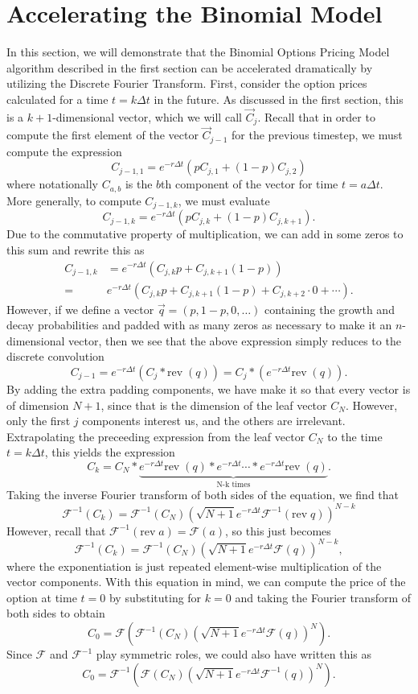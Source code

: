 \documentclass[11pt]{article}
\newcommand{\Rev}{\text{rev}\;}
\newcommand\del[1]{\left(#1\right)}
\newcommand\cF{\mathcal{F}}
\newcommand\Asterisk{*}
\begin{document}
\section*{Accelerating the Binomial Model}
In this section, we will demonstrate that the Binomial Options Pricing Model algorithm described in
the first section can be accelerated dramatically by utilizing the Discrete Fourier Transform.
First, consider the option prices calculated for a time $t = k\Delta t$ in the future. As discussed
in the first section, this is a $k+1$-dimensional vector, which we will call $\vec C_j$. Recall that
in order to compute the first element of the vector $\vec C_{j-1}$ for the previous timestep, we
must compute the expression
\[C_{j-1, 1} = e^{-r\Delta t}\del{pC_{j, 1} + (1-p)C_{j, 2}}\]
where notationally $C_{a, b}$ is the $b$th component of the vector for time $t=a\Delta t$. More
generally, to compute $C_{j-1, k}$, we must evaluate
\[C_{j-1, k} = e^{-r\Delta t}\del{pC_{j, k} + (1-p)C_{j, k+1}}.\]
Due to the commutative property of multiplication, we can add in some zeros to this sum and rewrite
this as
\begin{align*}
C_{j-1, k} &= e^{-r\Delta t}\del{C_{j, k}p + C_{j, k+1}(1-p)} \\
=\;& e^{-r\Delta t}\del{C_{j, k}p + C_{j, k+1}(1-p) + C_{j, k+2}\cdot 0 + \cdots}.
\end{align*}
However, if we define a vector $\vec q = (p, 1-p, 0, \ldots)$ containing the growth and decay
probabilities and padded with as many zeros as necessary to make it an $n$-dimensional vector, then
we see that the above expression simply reduces to the discrete convolution
\[C_{j-1} = e^{-r\Delta t} \del{C_j \Asterisk \Rev(q)} = C_j \Asterisk \del{e^{-r\Delta t}\Rev(q)}.\]
By adding the extra padding components, we have make it so that every vector is of dimension $N+1$,
since that is the dimension of the leaf vector $C_N$.  However, only the first $j$ components
interest us, and the others are irrelevant.  Extrapolating the preceeding expression from the leaf
vector $C_N$ to the time $t=k\Delta t$, this yields the expression
\[C_k = C_N \Asterisk \underbrace{e^{-r\Delta t}\Rev(q) \Asterisk e^{-r\Delta t} \cdots \Asterisk e^{-r\Delta t}\Rev(q)}_\text{N-k times}.\]
Taking the inverse Fourier transform of both sides of the equation, we find that
\[\cF^{-1}(C_k) = \cF^{-1}(C_N) \del{\sqrt{N + 1}e^{-r\Delta t} \cF^{-1}(\Rev q)}^{N-k}\]
However, recall that $\cF^{-1}(\Rev a) = \cF(a)$, so this just becomes 
\[\cF^{-1}(C_k) = \cF^{-1}(C_N) \del{\sqrt{N + 1}e^{-r\Delta t} \cF(q)}^{N-k},\]
where the exponentiation is just repeated element-wise multiplication of the vector components. With
this equation in mind, we can compute the price of the option at time $t=0$ by substituting for
$k=0$ and taking the Fourier transform of both sides to obtain
\[C_0 = \cF\del{\cF^{-1}(C_N) \del{\sqrt{N + 1}e^{-r\Delta t} \cF(q)}^N}.\]
Since $\cF$ and $\cF^{-1}$ play symmetric roles, we could also have written this as
\[C_0 = \cF^{-1}\del{\cF(C_N) \del{\sqrt{N + 1}e^{-r\Delta t} \cF^{-1}(q)}^N}.\]
\end{document}
